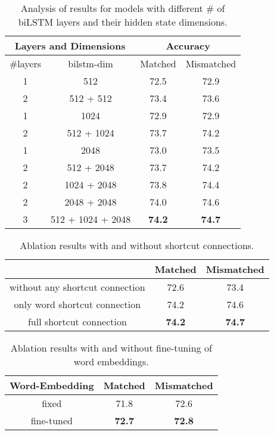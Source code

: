 \documentclass[11pt,letterpaper]{article}
\begin{document}
\begin{table}[ht!]
\begin{center}
\small
\begin{tabular}{|c|c|cc|}
\hline
\multicolumn{2}{|c|}{Layers and Dimensions} & \multicolumn{2}{|c|}{Accuracy} \\
\hline
\#layers & bilstm-dim & Matched & Mismatched \\
\hline
1 & 512 & 72.5 & 72.9\\
2 & 512 + 512 & 73.4 & 73.6\\
1 & 1024 & 72.9 & 72.9\\
2 & 512 + 1024 & 73.7 & 74.2\\
1 & 2048 & 73.0 & 73.5\\
2 & 512 + 2048 & 73.7 & 74.2\\
2 & 1024 + 2048 & 73.8 & 74.4\\
2 & 2048 + 2048 & 74.0 & 74.6\\
3 & 512 + 1024 + 2048 & \textbf{74.2} & \textbf{74.7}\\
\hline
\end{tabular}
\end{center}
\caption{Analysis of results for models with different \# of biLSTM layers and their hidden state dimensions.
}\label{tab:lstmlayersdims}
\end{table}


\begin{table}[ht!]
\begin{center}
\small
\begin{tabular}{|c|cc|}
\hline
& Matched & Mismatched \\
\hline
without any shortcut connection & 72.6 & 73.4\\
only word shortcut connection & 74.2 & 74.6\\
full shortcut connection & \textbf{74.2} & \textbf{74.7}\\
\hline
\end{tabular}
\end{center}
\caption{Ablation results with and without shortcut connections.}\label{tab:residual}
\end{table}

\begin{table}[ht!]
\begin{center}
\small
\begin{tabular}{|c|cc|}
\hline
Word-Embedding & Matched & Mismatched \\
\hline
fixed & 71.8 & 72.6\\
fine-tuned & \textbf{72.7} & \textbf{72.8}\\
\hline
\end{tabular}
\end{center}
\caption{Ablation results with and without fine-tuning of word embeddings.}\label{tab:ftwordembedding}
\end{table}
\end{document}

